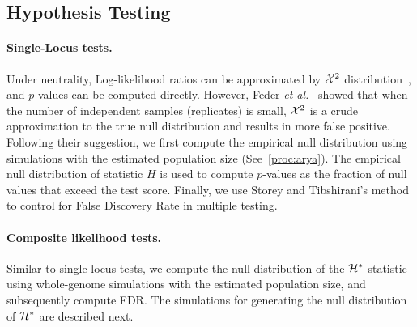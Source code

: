 \subsection{Hypothesis Testing}
\paragraph{Single-Locus tests.}
Under neutrality, Log-likelihood ratios can be approximated by ${\cal X}^2$
distribution~\cite{williams2001weighing}, and $p$-values can be
computed directly. However, Feder \emph{et
  al.}~\cite{feder2014Identifying} showed that when the number of
independent samples (replicates) is small, ${\cal X}^2$ is a crude
approximation to the true null distribution and results in more false
positive.  Following their suggestion, we first compute the empirical
null distribution using simulations with the estimated population size
(See~\ref{proc:arya}). The empirical null distribution of statistic
$H$ is used to compute $p$-values as the fraction of null values that
exceed the test score.  Finally, we use Storey and Tibshirani's
method~\cite{storey2003statistical} to control for False Discovery
Rate in multiple testing.


\paragraph{Composite likelihood tests.}

Similar to single-locus tests, we compute the null distribution of the
${\cal H}^*$ statistic using whole-genome simulations with the estimated
population size, and subsequently compute FDR. The simulations for
generating the null distribution of ${\cal H}^*$ are described next. 

